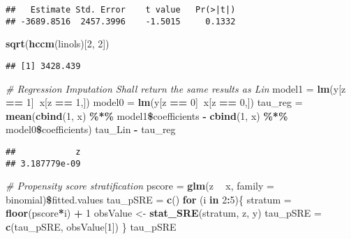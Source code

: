 \documentclass[]{article}
\newenvironment{Shaded}{\begin{snugshade}}{\end{snugshade}}
\newcommand{\KeywordTok}[1]{\textcolor[rgb]{0.13,0.29,0.53}{\textbf{#1}}}
\newcommand{\DataTypeTok}[1]{\textcolor[rgb]{0.13,0.29,0.53}{#1}}
\newcommand{\DecValTok}[1]{\textcolor[rgb]{0.00,0.00,0.81}{#1}}
\newcommand{\StringTok}[1]{\textcolor[rgb]{0.31,0.60,0.02}{#1}}
\newcommand{\CommentTok}[1]{\textcolor[rgb]{0.56,0.35,0.01}{\textit{#1}}}
\newcommand{\ControlFlowTok}[1]{\textcolor[rgb]{0.13,0.29,0.53}{\textbf{#1}}}
\newcommand{\OperatorTok}[1]{\textcolor[rgb]{0.81,0.36,0.00}{\textbf{#1}}}
\newcommand{\NormalTok}[1]{#1}
\begin{document}
\begin{verbatim}
##   Estimate Std. Error    t value   Pr(>|t|) 
## -3689.8516  2457.3996    -1.5015     0.1332
\end{verbatim}

\begin{Shaded}
\begin{Highlighting}[]
\KeywordTok{sqrt}\NormalTok{(}\KeywordTok{hccm}\NormalTok{(linols)[}\DecValTok{2}\NormalTok{, }\DecValTok{2}\NormalTok{])}
\end{Highlighting}
\end{Shaded}

\begin{verbatim}
## [1] 3428.439
\end{verbatim}

\begin{Shaded}
\begin{Highlighting}[]
\CommentTok{# Regression Imputation Shall return the same results as Lin}
\NormalTok{model1 =}\StringTok{ }\KeywordTok{lm}\NormalTok{(y[z }\OperatorTok{==}\StringTok{ }\DecValTok{1}\NormalTok{]}\OperatorTok{~}\NormalTok{x[z }\OperatorTok{==}\StringTok{ }\DecValTok{1}\NormalTok{,])}
\NormalTok{model0 =}\StringTok{ }\KeywordTok{lm}\NormalTok{(y[z }\OperatorTok{==}\StringTok{ }\DecValTok{0}\NormalTok{]}\OperatorTok{~}\NormalTok{x[z }\OperatorTok{==}\StringTok{ }\DecValTok{0}\NormalTok{,])}
\NormalTok{tau_reg =}\StringTok{ }\KeywordTok{mean}\NormalTok{(}\KeywordTok{cbind}\NormalTok{(}\DecValTok{1}\NormalTok{, x) }\OperatorTok{\%*\%}\StringTok{ }\NormalTok{model1}\OperatorTok{\$}\NormalTok{coefficients }\OperatorTok{-}\StringTok{ }\KeywordTok{cbind}\NormalTok{(}\DecValTok{1}\NormalTok{, x) }\OperatorTok{\%*\%}\StringTok{ }\NormalTok{model0}\OperatorTok{\$}\NormalTok{coefficients)}
\NormalTok{tau_Lin }\OperatorTok{-}\StringTok{ }\NormalTok{tau_reg}
\end{Highlighting}
\end{Shaded}

\begin{verbatim}
##            z 
## 3.187779e-09
\end{verbatim}

\begin{Shaded}
\begin{Highlighting}[]
\CommentTok{# Propensity score stratification}
\NormalTok{pscore =}\StringTok{ }\KeywordTok{glm}\NormalTok{(z }\OperatorTok{~}\StringTok{ }\NormalTok{x, }\DataTypeTok{family =}\NormalTok{ binomial)}\OperatorTok{\$}\NormalTok{fitted.values}
\NormalTok{tau_pSRE =}\StringTok{ }\KeywordTok{c}\NormalTok{()}
\ControlFlowTok{for}\NormalTok{ (i }\ControlFlowTok{in} \DecValTok{2}\OperatorTok{:}\DecValTok{5}\NormalTok{)\{}
\NormalTok{  stratum =}\StringTok{ }\KeywordTok{floor}\NormalTok{(pscore}\OperatorTok{*}\NormalTok{i) }\OperatorTok{+}\StringTok{ }\DecValTok{1}
\NormalTok{  obsValue <-}\StringTok{ }\KeywordTok{stat_SRE}\NormalTok{(stratum, z, y)}
\NormalTok{  tau_pSRE =}\StringTok{ }\KeywordTok{c}\NormalTok{(tau_pSRE, obsValue[}\DecValTok{1}\NormalTok{])}
\NormalTok{\}}
\NormalTok{tau_pSRE}
\end{Highlighting}
\end{Shaded}
\end{document}
